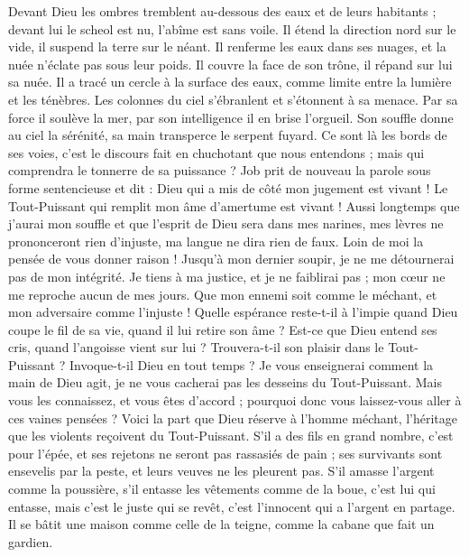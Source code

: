 \begin{multicols}{2}
Devant Dieu les ombres tremblent au-dessous des eaux et de leurs habitants ;
devant lui le scheol est nu, l'abîme est sans voile.
Il étend la direction nord sur le vide, il suspend la terre sur le néant.
Il renferme les eaux dans ses nuages, et la nuée n'éclate pas sous leur poids.
Il couvre la face de son trône, il répand sur lui sa nuée.
Il a tracé un cercle à la surface des eaux, comme limite entre la lumière et les ténèbres.
Les colonnes du ciel s'ébranlent et s'étonnent à sa menace.
Par sa force il soulève la mer, par son intelligence il en brise l'orgueil.
Son souffle donne au ciel la sérénité, sa main transperce le serpent fuyard.
Ce sont là les bords de ses voies, c'est le discours fait en chuchotant que nous entendons ; mais qui comprendra le tonnerre de sa puissance ?
\VerseOne{}Job prit de nouveau la parole sous forme sentencieuse et dit :
Dieu qui a mis de côté mon jugement est vivant ! Le Tout-Puissant qui remplit mon âme d'amertume est vivant !
Aussi longtemps que j'aurai mon souffle et que l'esprit de Dieu sera dans mes narines,
mes lèvres ne prononceront rien d'injuste, ma langue ne dira rien de faux.
Loin de moi la pensée de vous donner raison ! Jusqu'à mon dernier soupir, je ne me détournerai pas de mon intégrité.
Je tiens à ma justice, et je ne faiblirai pas ; mon cœur ne me reproche aucun de mes jours.
Que mon ennemi soit comme le méchant, et mon adversaire comme l'injuste !
Quelle espérance reste-t-il à l'impie quand Dieu coupe le fil de sa vie, quand il lui retire son âme ?
Est-ce que Dieu entend ses cris, quand l'angoisse vient sur lui ?
Trouvera-t-il son plaisir dans le Tout-Puissant ? Invoque-t-il Dieu en tout temps ?
Je vous enseignerai comment la main de Dieu agit, je ne vous cacherai pas les desseins du Tout-Puissant.
Mais vous les connaissez, et vous êtes d'accord ; pourquoi donc vous laissez-vous aller à ces vaines pensées ?
Voici la part que Dieu réserve à l'homme méchant, l'héritage que les violents reçoivent du Tout-Puissant.
S'il a des fils en grand nombre, c'est pour l'épée, et ses rejetons ne seront pas rassasiés de pain ;
ses survivants sont ensevelis par la peste, et leurs veuves ne les pleurent pas.
S'il amasse l'argent comme la poussière, s'il entasse les vêtements comme de la boue,
c'est lui qui entasse, mais c'est le juste qui se revêt, c'est l'innocent qui a l'argent en partage.
Il se bâtit une maison comme celle de la teigne, comme la cabane que fait un gardien.

\end{multicols}

